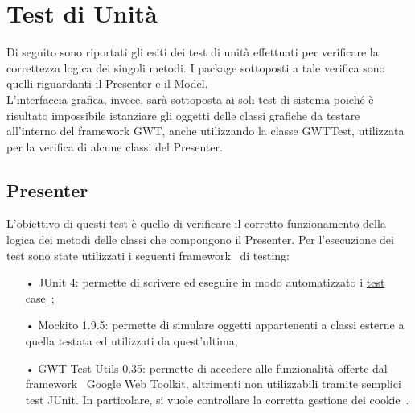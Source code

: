 %
%

\section{Test di Unità}{
	\begin{sloppypar} %
	Di seguito sono riportati gli esiti dei test di unità effettuati per verificare la correttezza logica dei singoli metodi. I package sottoposti a tale verifica sono quelli riguardanti il Presenter e il Model. \\
L'interfaccia grafica, invece, sarà sottoposta ai soli test di sistema poiché è risultato impossibile istanziare gli oggetti delle classi grafiche da testare all'interno del framework GWT, anche utilizzando la classe GWTTest, utilizzata per la verifica di alcune classi del Presenter.

	\subsection{Presenter}{
		L'obiettivo di questi test è quello di verificare il corretto funzionamento della logica dei metodi delle classi che compongono il Presenter. Per l’esecuzione dei test sono state utilizzati i seguenti framework\g~ di testing:
		\begin{itemize}
			\item[•] JUnit 4: permette di scrivere ed eseguire in modo automatizzato i \underline{test case}\g~;
			\item[•] Mockito 1.9.5: permette di simulare oggetti appartenenti a classi esterne a quella testata ed utilizzati da quest’ultima;
			\item[•] GWT Test Utils 0.35: permette di accedere alle funzionalità offerte dal framework\g~ Google Web Toolkit, altrimenti non utilizzabili tramite semplici test JUnit. In particolare, si vuole controllare la corretta gestione dei cookie\g~.
		\end{itemize}
		
}
\end{sloppypar}}
